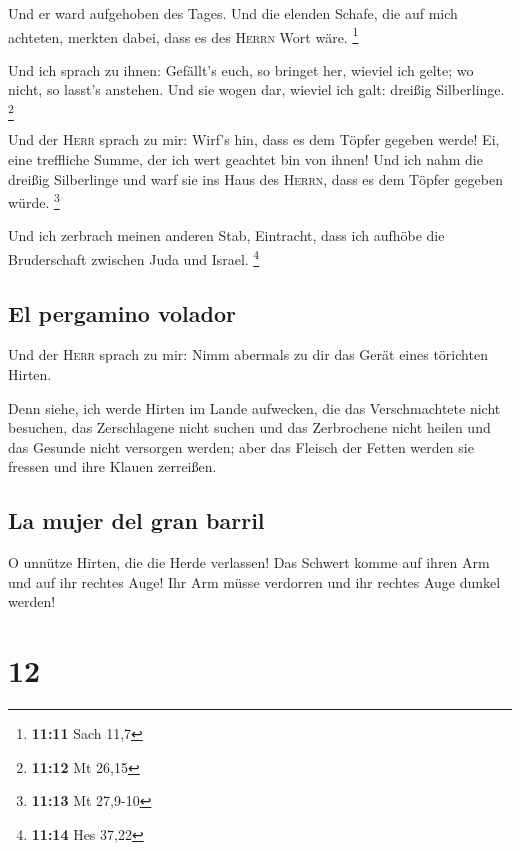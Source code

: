  Und er ward aufgehoben des Tages. Und die elenden
Schafe, die auf mich achteten, merkten dabei, dass es des \textsc{Herrn}
Wort wäre. \footnote{\textbf{11:11} Sach 11,7}

 Und ich sprach zu ihnen: Gefällt's euch, so bringet her,
wieviel ich gelte; wo nicht, so lasst's anstehen. Und sie wogen dar,
wieviel ich galt: dreißig Silberlinge. \footnote{\textbf{11:12} Mt 26,15}

 Und der \textsc{Herr} sprach zu mir: Wirf's hin, dass es
dem Töpfer gegeben werde! Ei, eine treffliche Summe, der ich wert
geachtet bin von ihnen! Und ich nahm die dreißig Silberlinge und warf
sie ins Haus des \textsc{Herrn}, dass es dem Töpfer gegeben würde.
\footnote{\textbf{11:13} Mt 27,9-10}

 Und ich zerbrach meinen anderen Stab, Eintracht, dass
ich aufhöbe die Bruderschaft zwischen Juda und Israel. \footnote{\textbf{11:14}
  Hes 37,22}

\hypertarget{el-pergamino-volador}{%
\subsection{El pergamino volador}\label{el-pergamino-volador}}

 Und der \textsc{Herr} sprach zu mir: Nimm abermals zu
dir das Gerät eines törichten Hirten.

 Denn siehe, ich werde Hirten im Lande aufwecken, die das
Verschmachtete nicht besuchen, das Zerschlagene nicht suchen und das
Zerbrochene nicht heilen und das Gesunde nicht versorgen werden; aber
das Fleisch der Fetten werden sie fressen und ihre Klauen zerreißen.

\hypertarget{la-mujer-del-gran-barril}{%
\subsection{La mujer del gran barril}\label{la-mujer-del-gran-barril}}

 O unnütze Hirten, die die Herde verlassen! Das Schwert
komme auf ihren Arm und auf ihr rechtes Auge! Ihr Arm müsse verdorren
und ihr rechtes Auge dunkel werden!

\hypertarget{section-11}{%
\section{12}\label{section-11}}

